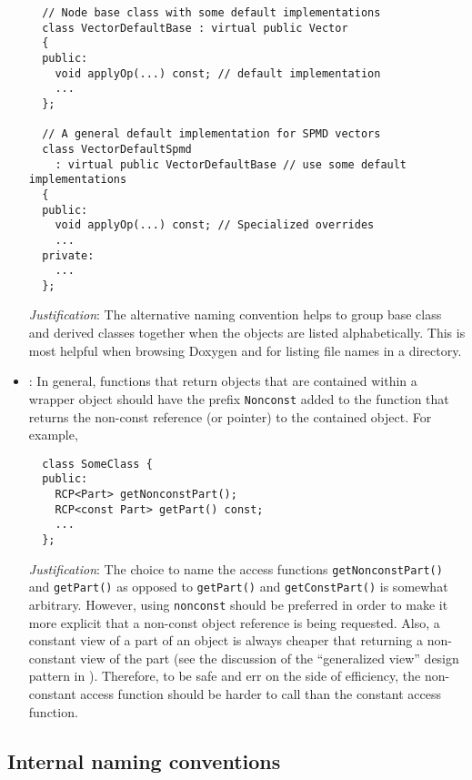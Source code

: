 \begin{itemize}
{\begin{verbatim}
  // Node base class with some default implementations
  class VectorDefaultBase : virtual public Vector
  {
  public:
    void applyOp(...) const; // default implementation
    ...
  };

  // A general default implementation for SPMD vectors
  class VectorDefaultSpmd
    : virtual public VectorDefaultBase // use some default implementations
  {
  public:
    void applyOp(...) const; // Specialized overrides
    ...
  private:
    ...
  };
\end{verbatim}}

\textit{Justification}: The alternative naming convention helps to group base class and derived classes together when the objects are listed alphabetically.  This is most helpful when browsing Doxygen and for listing file names in a directory.  

\item\NCConstNonconstAccessFunctionName: In general, functions that
  return objects that are contained within a wrapper object should
  have the prefix \texttt{Nonconst} added to the function that returns
  the non-const reference (or pointer) to the contained object.  For
  example,

{\small\begin{verbatim}
  class SomeClass {
  public:
    RCP<Part> getNonconstPart();
    RCP<const Part> getPart() const;
    ...
  };
\end{verbatim}}

  \textit{Justification}: The choice to name the access functions
  \texttt{getNonconstPart()} and \texttt{getPart()} as opposed to
  \texttt{getPart()} and \texttt{getConstPart()} is somewhat
  arbitrary.  However, using \texttt{nonconst} should be preferred in
  order to make it more explicit that a non-const object reference is
  being requested.  Also, a constant view of a part of an object is
  always cheaper that returning a non-constant view of the part (see
  the discussion of the ``generalized view'' design pattern in
  {}\cite{TeuchosMemoryManagementGuide}).  Therefore, to be safe and
  err on the side of efficiency, the non-constant access function
  should be harder to call than the constant access function.

\end{itemize}


%
\subsection{Internal naming conventions}
\label{sec:InternalNamingConventions}

